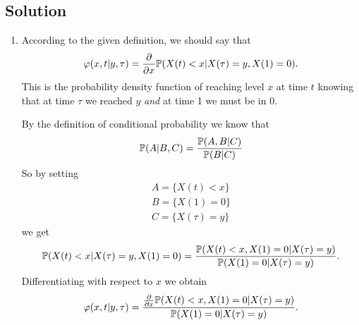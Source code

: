\documentclass[12pt]{article}
\begin{document}
	\subsection*{Solution}
	\begin{enumerate}
		\item According to the given definition, we should say that
		\begin{equation*}
			\varphi(x,t|y,\tau)=\frac{\partial}{\partial x}\mathbb{P}(X(t)<x|X(\tau)=y,X(1)=0).
		\end{equation*}
		This is the probability density function of reaching level $x$ at time $t$ knowing that at time $\tau$ we reached $y$ \textit{and} at time 1 we must be in 0.
		
		By the definition of conditional probability we know that 
		\begin{equation*}
			\mathbb{P}(A|B,C)=\frac{\mathbb{P}(A,B|C)}{\mathbb{P}(B|C)}
		\end{equation*}
		So by setting
		\begin{equation*}
			\begin{array}{c}
				A=\{X(t)<x\}\\
				B=\{X(1)=0\}\\
				C=\{X(\tau)=y\}
			\end{array}
		\end{equation*}
		we get
		\begin{equation*}
			\mathbb{P}(X(t)<x|X(\tau)=y,X(1)=0)=\frac{\mathbb{P}(X(t)<x,X(1)=0|X(\tau)=y)}{\mathbb{P}(X(1)=0|X(\tau)=y)}.
		\end{equation*}
		Differentiating with respect to $x$ we obtain
		\begin{equation*}
			\varphi(x,t|y,\tau)=\frac{\frac{\partial}{\partial x}\mathbb{P}(X(t)<x,X(1)=0|X(\tau)=y)}{\mathbb{P}(X(1)=0|X(\tau)=y)}.
		\end{equation*}
		\begin{comment}	
			At the same time we know that 
			\begin{equation*}
				\pr(A,B|C)=\pr(A|B,C)\pr(B|C)
			\end{equation*}
			so, using the events we defined earlier, we can rewrite the numerator of the right hand side of the above equation as
			\begin{equation*}
				\pr(X(t)<x,X(1)=0|X(\tau)=y)=\pr(X(t)<x|X(1)=0,X(\tau)=y)\pr(X(1)=0|X(\tau)=y).
			\end{equation*}
			If we differentiate with respect to $x$ we get
			\begin{align*}
				\frac{\partial}{\partial x}\pr(X(t)<x,X(1)=0|X(\tau)=y)&=\pr(X(1)=0|X(\tau)=y)\frac{\partial}{\partial x}\pr(X(t)<x|X(1)=0,X(\tau)=y)

\end{comment}
\end{enumerate}
\end{document}
